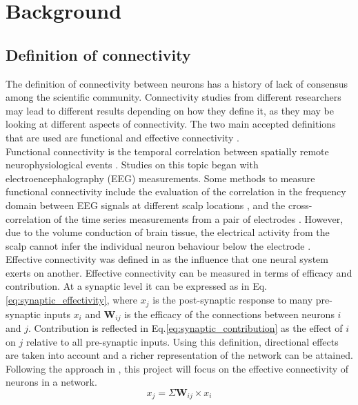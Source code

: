 \documentclass[11pt]{article}
\begin{document}
\section{Background}

\subsection{Definition of connectivity}

The definition of connectivity between neurons has a history of lack of consensus among the scientific community. Connectivity studies from different researchers may lead to different results depending on how they define it, as they may be looking at different aspects of connectivity. The two main accepted definitions that are used are functional and effective connectivity \cite{HORWITZ2003466}.
\\
Functional connectivity is the temporal correlation between spatially remote neurophysiological events \cite{friston1993functional}. Studies on this topic began with electroencephalography (EEG) measurements. Some methods to measure functional connectivity include the evaluation of the correlation in the frequency domain between EEG signals at different scalp locations \cite{pfurtscheller1999event}, and the cross-correlation of the time series measurements from a pair of electrodes \cite{gevins1985neurocognitive}. However, due to the volume conduction of brain tissue, the electrical activity from the scalp cannot infer the individual neuron behaviour below the electrode \cite{HORWITZ2003466}.
\\
Effective connectivity was defined in \cite{friston1993functional} as the influence that one neural system exerts on another. Effective connectivity can be measured in terms of efficacy and contribution. At a synaptic level it can be expressed as in Eq.\ref{eq:synaptic_effectivity}, where $x_{j}$ is the post-synaptic response to many pre-synaptic inputs $x_{i}$ and $\textbf{W}_{ij}$ is the efficacy of the connections between neurons $i$ and $j$. Contribution is reflected in Eq.\ref{eq:synaptic_contribution} as the effect of $i$ on $j$ relative to all pre-synaptic inputs. Using this definition, directional effects are taken into account and a richer representation of the network can be attained. Following the approach in \cite{alexandru2018estimating}, this project will focus on the effective connectivity of neurons in a network.
\\

\begin{equation}\label{eq:synaptic_effectivity}
x_{j} = \Sigma \textbf{W}_{ij}\times x_{i}
\end{equation}
\end{document}
